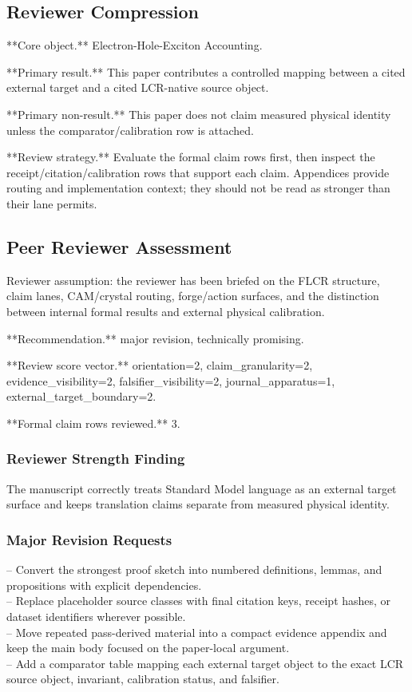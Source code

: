 \documentclass[11pt]{article}
\begin{document}
\subsection*{Reviewer Compression}

**Core object.** Electron-Hole-Exciton Accounting.

**Primary result.** This paper contributes a controlled mapping between a cited external target and a cited LCR-native source object.

**Primary non-result.** This paper does not claim measured physical identity unless the comparator/calibration row is attached.

**Review strategy.** Evaluate the formal claim rows first, then inspect the receipt/citation/calibration rows that support each claim. Appendices provide routing and implementation context; they should not be read as stronger than their lane permits.

\subsection*{Peer Reviewer Assessment}

Reviewer assumption: the reviewer has been briefed on the FLCR structure, claim lanes, CAM/crystal routing, forge/action surfaces, and the distinction between internal formal results and external physical calibration.

**Recommendation.** major revision, technically promising.

**Review score vector.** orientation=2, claim\_granularity=2, evidence\_visibility=2, falsifier\_visibility=2, journal\_apparatus=1, external\_target\_boundary=2.

**Formal claim rows reviewed.** 3.

\subsubsection*{Reviewer Strength Finding}

The manuscript correctly treats Standard Model language as an external target surface and keeps translation claims separate from measured physical identity.

\subsubsection*{Major Revision Requests}

\noindent{}-- Convert the strongest proof sketch into numbered definitions, lemmas, and propositions with explicit dependencies.\\
\noindent{}-- Replace placeholder source classes with final citation keys, receipt hashes, or dataset identifiers wherever possible.\\
\noindent{}-- Move repeated pass-derived material into a compact evidence appendix and keep the main body focused on the paper-local argument.\\
\noindent{}-- Add a comparator table mapping each external target object to the exact LCR source object, invariant, calibration status, and falsifier.\\
\end{document}
